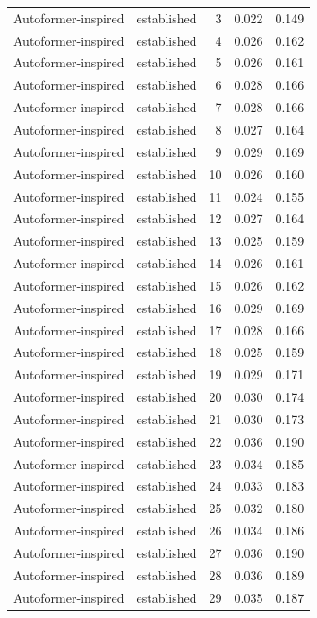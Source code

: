 \begin{tabular}{llrrr}
Autoformer-inspired & established & 3 & 0.022 & 0.149 \\
Autoformer-inspired & established & 4 & 0.026 & 0.162 \\
Autoformer-inspired & established & 5 & 0.026 & 0.161 \\
Autoformer-inspired & established & 6 & 0.028 & 0.166 \\
Autoformer-inspired & established & 7 & 0.028 & 0.166 \\
Autoformer-inspired & established & 8 & 0.027 & 0.164 \\
Autoformer-inspired & established & 9 & 0.029 & 0.169 \\
Autoformer-inspired & established & 10 & 0.026 & 0.160 \\
Autoformer-inspired & established & 11 & 0.024 & 0.155 \\
Autoformer-inspired & established & 12 & 0.027 & 0.164 \\
Autoformer-inspired & established & 13 & 0.025 & 0.159 \\
Autoformer-inspired & established & 14 & 0.026 & 0.161 \\
Autoformer-inspired & established & 15 & 0.026 & 0.162 \\
Autoformer-inspired & established & 16 & 0.029 & 0.169 \\
Autoformer-inspired & established & 17 & 0.028 & 0.166 \\
Autoformer-inspired & established & 18 & 0.025 & 0.159 \\
Autoformer-inspired & established & 19 & 0.029 & 0.171 \\
Autoformer-inspired & established & 20 & 0.030 & 0.174 \\
Autoformer-inspired & established & 21 & 0.030 & 0.173 \\
Autoformer-inspired & established & 22 & 0.036 & 0.190 \\
Autoformer-inspired & established & 23 & 0.034 & 0.185 \\
Autoformer-inspired & established & 24 & 0.033 & 0.183 \\
Autoformer-inspired & established & 25 & 0.032 & 0.180 \\
Autoformer-inspired & established & 26 & 0.034 & 0.186 \\
Autoformer-inspired & established & 27 & 0.036 & 0.190 \\
Autoformer-inspired & established & 28 & 0.036 & 0.189 \\
Autoformer-inspired & established & 29 & 0.035 & 0.187 \\

\end{tabular}
